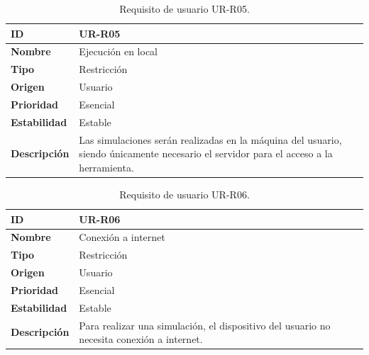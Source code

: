 \begin{center}
\begin{table}[htbp]
\centering
\begin{tabular}{@{}p{2.5cm} p{9cm}@{}} 
\toprule
\textbf{ID} 				& UR-R05 \\
\midrule
\textbf{Nombre} 			& Ejecución en local \\
\midrule
\textbf{Tipo} 			& Restricción \\
\midrule
\textbf{Origen} 			& Usuario \\
\midrule
\textbf{Prioridad}		& Esencial \\
\midrule
\textbf{Estabilidad} 		& Estable \\
\midrule
\textbf{Descripción} 	& Las simulaciones serán realizadas en la máquina del usuario, siendo únicamente necesario el servidor para el acceso a la herramienta. \\
\bottomrule
\end{tabular}
\caption{Requisito de usuario UR-R05.}
\label{tab:urr05}
\end{table}
\end{center}

\begin{center}
\begin{table}[htbp]
\centering
\begin{tabular}{@{}p{2.5cm} p{9cm}@{}} 
\toprule
\textbf{ID} 				& UR-R06 \\
\midrule
\textbf{Nombre} 			& Conexión a internet \\
\midrule
\textbf{Tipo} 			& Restricción \\
\midrule
\textbf{Origen} 			& Usuario \\
\midrule
\textbf{Prioridad}		& Esencial \\
\midrule
\textbf{Estabilidad} 		& Estable \\
\midrule
\textbf{Descripción} 	& Para realizar una simulación, el dispositivo del usuario no necesita conexión a internet. \\
\bottomrule
\end{tabular}
\caption{Requisito de usuario UR-R06.}
\label{tab:urr06}
\end{table}
\end{center}

